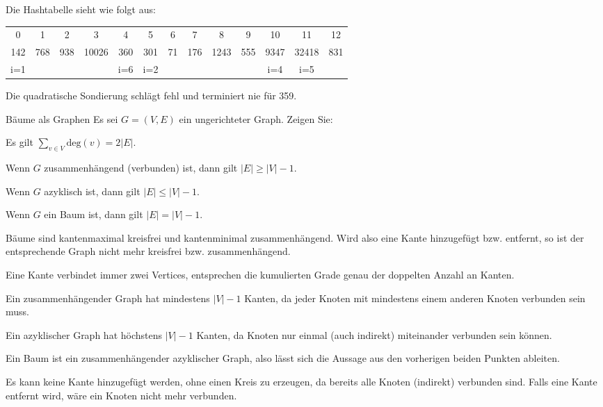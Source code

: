 \documentclass{article}
\begin{document}
\begin{solutions}
  \item Die Hashtabelle sieht wie folgt aus:
  \begin{table*}[ht]
    \centering
    \begin{tabular}{|c|c|c|c|c| c|c|c|c|c| c|c|c|}
      0   & 1   & 2   & 3     & 4   & 5   & 6  & 7   & 8    & 9   & 10   & 11    & 12  \\
      142 & 768 & 938 & 10026 & 360 & 301 & 71 & 176 & 1243 & 555 & 9347 & 32418 & 831 \\
      i=1 &     &     &       & i=6 & i=2 &    &     &      &     & i=4  & i=5   &     \\
    \end{tabular}
  \end{table*}
  \item Die quadratische Sondierung schlägt fehl und terminiert nie für 359.
\end{solutions}

\begin{eexercises}{Bäume als Graphen}{
    Es sei $G = (V, E)$ ein ungerichteter Graph. Zeigen Sie:
  }
  \item Es gilt $\sum_{v \in V} \text{deg}(v) = 2|E|$.
  \item Wenn $G$ zusammenhängend (verbunden) ist, dann gilt $|E| \geq |V| - 1$.
  \item Wenn $G$ azyklisch ist, dann gilt $|E| \leq |V| - 1$.
  \item Wenn $G$ ein Baum ist, dann gilt $|E| = |V| - 1$.
  \item Bäume sind kantenmaximal kreisfrei und kantenminimal zusammenhängend. Wird also eine Kante hinzugefügt bzw. entfernt, so ist der entsprechende Graph nicht mehr kreisfrei bzw. zusammenhängend.
\end{eexercises}

\begin{solutions}
  \item Eine Kante verbindet immer zwei Vertices, entsprechen die kumulierten Grade genau der doppelten Anzahl an Kanten.
  \item Ein zusammenhängender Graph hat mindestens $|V| - 1$ Kanten, da jeder Knoten mit mindestens einem anderen Knoten verbunden sein muss.
  \item Ein azyklischer Graph hat höchstens $|V| - 1$ Kanten, da Knoten nur einmal (auch indirekt) miteinander verbunden sein können.
  \item Ein Baum ist ein zusammenhängender azyklischer Graph, also lässt sich die Aussage aus den vorherigen beiden Punkten ableiten.
  \item Es kann keine Kante hinzugefügt werden, ohne einen Kreis zu erzeugen, da bereits alle Knoten (indirekt) verbunden sind. Falls eine Kante entfernt wird, wäre ein Knoten nicht mehr verbunden.
\end{solutions}
\end{document}
